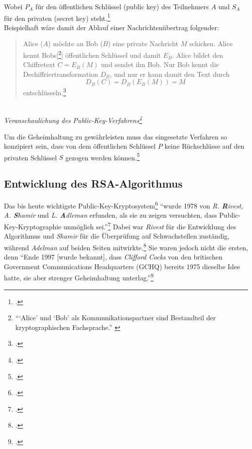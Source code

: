 \documentclass{scrarticle} %
\begin{document}
        Wobei $P_A$ für den öffentlichen Schlüssel (public key) des Teilnehmers $A$ und $S_A$ für den privaten (secret key) steht.\footcite[Vgl.][21f.]{ertel2003}\\
        Beispielhaft wäre damit der Ablauf einer Nachrichtenübertrag folgender:
        \begin{quote}
            Alice ($A$) möchte an Bob ($B$) eine private Nachricht $M$ schicken. Alice kennt Bobs[\footnote{\enquote{\enquote*{Alice} und \enquote*{Bob} als Kommunikationspartner sind Bestandteil der kryptographischen Fachsprache.} \cite[21]{ertel2003}}] öffentlichen Schlüssel und damit $E_B$. Alice bildet den Chiffretext $C = E_B(M)$ und sendet ihn Bob. Nur Bob kennt die Dechiffriertransformation $D_B$, und nur er kann damit den Text durch
            \begin{equation*}
                D_B(C) = D_B(E_B(M)) = M
            \end{equation*}
            entschlüsseln.\footcite[68]{watjen2008}
        \end{quote}
        \begin{center}
            \\
            \emph{Veranschaulichung des Public-Key-Verfahrens\footcite[67]{watjen2008}}\\            
        \end{center}
        Um die Geheimhaltung zu gewährleisten muss das eingesetzte Verfahren so konzipiert sein, dass von dem öffentlichen Schlüssel $P$ keine Rückschlüsse auf den privaten Schlüssel $S$ gezogen werden können.\footcite[49]{beutelspacher2015} %
    
    \subsection{Entwicklung des RSA-Algorithmus}
        Das bis heute wichtigste Public-Key-Kryptosystem\footcite[Vgl.][26]{pieprzyk2010topics} \enquote{wurde 1978 von \emph{R. \textbf{R}ivest},\\ \emph{A. \textbf{S}hamir} und \emph{L. \textbf{A}dleman} erfunden, als sie zu zeigen versuchten, dass Public-Key-Kryptographie unmöglich sei.}\footcite[77]{beutelspacher2015} Dabei war \emph{Rivest} für die Entwicklung des Algorithmus und \emph{Shamir} für die Überprüfung auf Schwachstellen zuständig, während \emph{Adelman} auf beiden Seiten mitwirkte.\footcite[77]{ertel2003} Sie waren jedoch nicht die ersten, denn \enquote{Ende 1997 [wurde bekannt], dass \emph{Clifford Cocks} von den britischen Government Communications Headquarters (GCHQ) bereits 1975 dieselbe Idee hatte, sie aber strenger Geheimhaltung unterlag.}\footcite[71]{watjen2008}%
    
\end{document}
